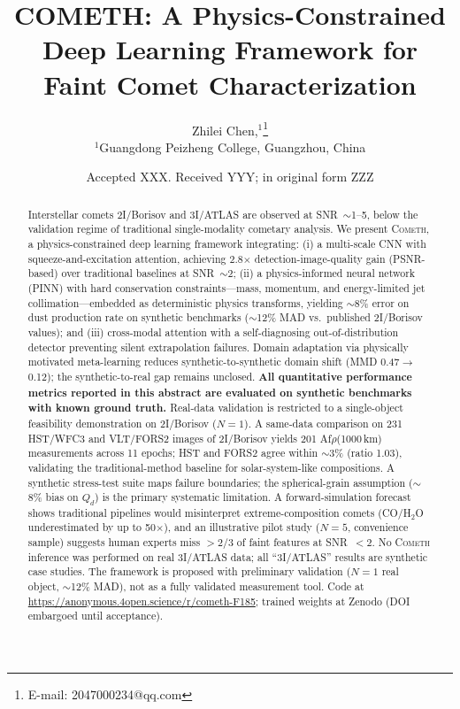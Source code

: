 \documentclass[usenatbib]{mnras}
\begin{document}
\title[COMETH: A Physics-Constrained Deep Learning Framework]{COMETH: A Physics-Constrained Deep Learning Framework for Faint Comet Characterization}

\author[Chen]{
Zhilei Chen,$^{1}$\thanks{E-mail: 2047000234@qq.com}
\\
$^{1}$Guangdong Peizheng College, Guangzhou, China
}

\date{Accepted XXX. Received YYY; in original form ZZZ}

\begin{abstract}
Interstellar comets 2I/Borisov and 3I/ATLAS are observed at SNR~$\sim$1--5, below the validation regime of traditional single-modality cometary analysis. We present \textsc{Cometh}, a physics-constrained deep learning framework integrating: (i) a multi-scale CNN with squeeze-and-excitation attention, achieving 2.8$\times$ detection-image-quality gain (PSNR-based) over traditional baselines at SNR~$\sim$2; (ii) a physics-informed neural network (PINN) with hard conservation constraints---mass, momentum, and energy-limited jet collimation---embedded as deterministic physics transforms, yielding $\sim$8\% error on dust production rate on synthetic benchmarks ($\sim$12\% MAD vs.\ published 2I/Borisov values); and (iii) cross-modal attention with a self-diagnosing out-of-distribution detector preventing silent extrapolation failures. Domain adaptation via physically motivated meta-learning reduces synthetic-to-synthetic domain shift (MMD 0.47$\to$0.12); the synthetic-to-real gap remains unclosed. \textbf{All quantitative performance metrics reported in this abstract are evaluated on synthetic benchmarks with known ground truth.} Real-data validation is restricted to a single-object feasibility demonstration on 2I/Borisov ($N=1$). A same-data comparison on 231 HST/WFC3 and VLT/FORS2 images of 2I/Borisov yields 201 Af$\rho$(1000\,km) measurements across 11 epochs; HST and FORS2 agree within $\sim$3\% (ratio 1.03), validating the traditional-method baseline for solar-system-like compositions. A synthetic stress-test suite maps failure boundaries; the spherical-grain assumption ($\sim$8\% bias on $Q_d$) is the primary systematic limitation. A forward-simulation forecast shows traditional pipelines would misinterpret extreme-composition comets (CO/H$_2$O underestimated by up to 50$\times$), and an illustrative pilot study ($N=5$, convenience sample) suggests human experts miss $>2/3$ of faint features at SNR~$<2$. No \textsc{Cometh} inference was performed on real 3I/ATLAS data; all ``3I/ATLAS'' results are synthetic case studies. The framework is proposed with preliminary validation ($N=1$ real object, $\sim$12\% MAD), not as a fully validated measurement tool. Code at \url{https://anonymous.4open.science/r/cometh-F185}; trained weights at Zenodo (DOI embargoed until acceptance).
\end{abstract}
\end{document}
